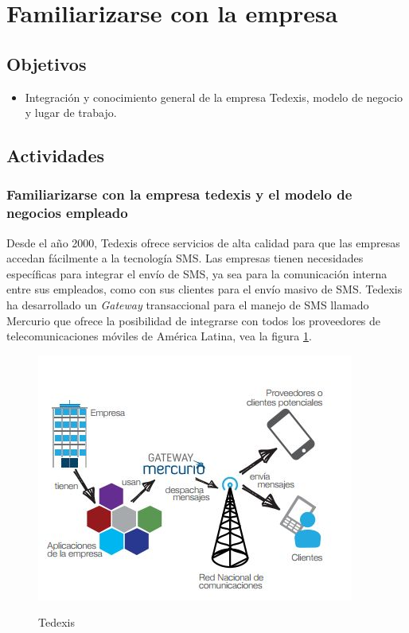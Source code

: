  
\section{Familiarizarse con la empresa} \label{sect:Familiarizarse con la empresa}

\subsection{Objetivos}
\begin{itemize}[noitemsep,nolistsep]
\item Integración y conocimiento general de la empresa Tedexis, modelo de negocio y lugar de trabajo. 
\end{itemize}

\subsection{Actividades}

\subsubsection{Familiarizarse con la empresa tedexis y el modelo de negocios empleado}
\indent Desde el año 2000, Tedexis ofrece servicios de alta calidad para que las empresas accedan fácilmente a la tecnología SMS. Las empresas tienen necesidades específicas para integrar el envío de SMS, ya sea para la comunicación interna entre sus empleados, como con sus clientes para el envío masivo de SMS.
\newline
\newline
\indent Tedexis ha desarrollado un \textit{Gateway} transaccional para el manejo de SMS llamado Mercurio que ofrece la posibilidad de integrarse con todos los proveedores de telecomunicaciones móviles de América Latina, vea la figura \ref{fig:tdx}.

\begin{figure}[ht]
  \centering
  \includegraphics[scale=0.75,type=png,ext=.jpeg,read=.jpeg]{imagenes/tdx2} \\
  \caption{Tedexis}
  \label{fig:tdx}
\end{figure}
\pagebreak

